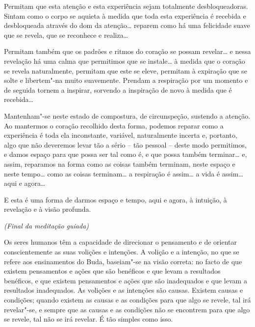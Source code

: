 Permitam que esta atenção e esta experiência sejam totalmente desbloqueadoras.
Sintam como o corpo se aquieta à medida que toda esta experiência é recebida e
desbloqueada através do dom da atenção\ldots{} reparem como há uma felicidade
suave que se revela, que se reconhece e realiza\ldots{}

\enlargethispage{\baselineskip}

Permitam também que os padrões e ritmos do coração se possam revelar\ldots{} e
nessa revelação há uma calma que permitimos que se instale\ldots{} à medida que
o coração se revela naturalmente, permitam que este se eleve, permitam à
expiração que se solte e libertem"-na muito suavemente. Prendam a respiração por
um momento e de seguida tornem a inspirar, sorvendo a inspiração de novo à
medida que é recebida\ldots{}

Mantenham"-se neste estado de compostura, de circunspeção, sustendo a atenção. Ao
mantermos o coração recolhido desta forma, podemos reparar como a experiência é
toda ela inconstante, variável, naturalmente incerta e, portanto, algo que não
deveremos levar tão a sério -- tão pessoal -- deste modo permitimos, e damos
espaço para que possa ser tal como é, e que possa também terminar\ldots{} e,
assim, reparamos na forma como as coisas também terminam, neste espaço e neste
tempo\ldots{} como as coisas terminam\ldots{} a respiração é assim\ldots{} a
vida é assim\ldots{} aqui e agora\ldots{}

\enlargethispage{\baselineskip}

E esta é uma forma de darmos espaço e tempo, aqui e agora, à intuição, à
revelação e à visão profunda.

\bigskip

{\centering
\textit{(Final da meditação guiada)}
\par}

\bigskip

Os seres humanos têm a capacidade de direcionar o pensamento e de orientar
conscientemente as suas volições e intenções. A volição e a intenção, no que se
refere aos ensinamentos do Buda, baseiam"-se na visão correta: no facto de que
existem pensamentos e ações que são benéficos e que levam a resultados
benéficos, e que existem pensamentos e ações que são inadequados e que levam a
resultados inadequados. As volições e as intenções são causas. Existem causas e
condições; quando existem as causas e as condições para que algo se revele, tal
irá revelar"-se, e sempre que as causas e as condições não se encontrem para que
algo se revele, tal não se irá revelar. É tão simples como isso.

